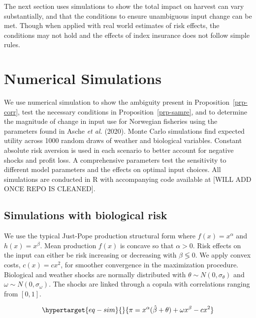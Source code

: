 \documentclass[
  letterpaper,
  DIV=11,
  numbers=noendperiod]{scrartcl}
\theoremstyle{plain}
\theoremstyle{plain}
\theoremstyle{remark}
\begin{document}
The next section uses simulations to show the total impact on harvest
can vary substantially, and that the conditions to ensure unambiguous
input change can be met. Though when applied with real world estimates
of risk effects, the conditions may not hold and the effects of index
insurance does not follow simple rules.

\hypertarget{sec-sim}{%
\section{Numerical Simulations}\label{sec-sim}}

We use numerical simulation to show the ambiguity present in
Proposition~\ref{prp-corr}, test the necessary conditions in
Proposition~\ref{prp-samre}, and to determine the magnitude of change in
input use for Norwegian fisheries using the parameters found in Asche
\emph{et al.} (2020). Monte Carlo simulations find expected utility
across 1000 random draws of weather and biological variables. Constant
absolute risk aversion is used in each scenario to better account for
negative shocks and profit loss. A comprehensive parameters test the
sensitivity to different model parameters and the effects on optimal
input choices. All simulations are conducted in R with accompanying code
available at {[}WILL ADD ONCE REPO IS CLEANED{]}.

\hypertarget{simulations-with-biological-risk}{%
\subsection{Simulations with biological
risk}\label{simulations-with-biological-risk}}

We use the typical Just-Pope production structural form where
\(f(x)=x^\alpha\) and \(h(x)=x^\beta\). Mean production \(f(x)\) is
concave so that \(\alpha>0\). Risk effects on the input can either be
risk increasing or decreasing with \(\beta\lessgtr0\). We apply convex
costs, \(c(x)=cx^2\), for smoother convergence in the maximization
procedure. Biological and weather shocks are normally distributed with
\(\theta\sim N(0,\sigma_{\theta})\) and
\(\omega\sim N(0,\sigma_{\omega})\). The shocks are linked through a
copula with correlations ranging from \([0,1]\).

\begin{equation}\protect\hypertarget{eq-sim}{}{
\pi=x^\alpha(\hat\beta+\theta)+\omega x^\beta-cx^2
}\label{eq-sim}\end{equation}
\end{document}
